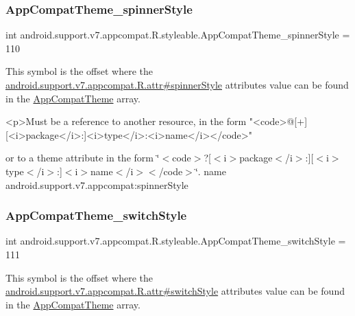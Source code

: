 \subsubsection{\texorpdfstring{App\+Compat\+Theme\+\_\+spinner\+Style}{AppCompatTheme\_spinnerStyle}}
{\footnotesize\ttfamily int android.\+support.\+v7.\+appcompat.\+R.\+styleable.\+App\+Compat\+Theme\+\_\+spinner\+Style = 110\hspace{0.3cm}{\ttfamily [static]}}

This symbol is the offset where the \hyperlink{classandroid_1_1support_1_1v7_1_1appcompat_1_1R_1_1attr_a756d2c11dcb65821e13f93739bb74526}{android.\+support.\+v7.\+appcompat.\+R.\+attr\#spinner\+Style} attribute\textquotesingle{}s value can be found in the \hyperlink{classandroid_1_1support_1_1v7_1_1appcompat_1_1R_1_1styleable_a5c42f89e8a410c323be34208d75c430b}{App\+Compat\+Theme} array.

\begin{DoxyVerb}      <p>Must be a reference to another resource, in the form "<code>@[+][<i>package</i>:]<i>type</i>:<i>name</i></code>"
\end{DoxyVerb}
 or to a theme attribute in the form \char`\"{}$<$code$>$?\mbox{[}$<$i$>$package$<$/i$>$\+:\mbox{]}\mbox{[}$<$i$>$type$<$/i$>$\+:\mbox{]}$<$i$>$name$<$/i$>$$<$/code$>$\char`\"{}.  name android.\+support.\+v7.\+appcompat\+:spinner\+Style \mbox{\label{classandroid_1_1support_1_1v7_1_1appcompat_1_1R_1_1styleable_a57e1f510b55a34ce46089f5c131a9d99}} 
\subsubsection{\texorpdfstring{App\+Compat\+Theme\+\_\+switch\+Style}{AppCompatTheme\_switchStyle}}
{\footnotesize\ttfamily int android.\+support.\+v7.\+appcompat.\+R.\+styleable.\+App\+Compat\+Theme\+\_\+switch\+Style = 111\hspace{0.3cm}{\ttfamily [static]}}

This symbol is the offset where the \hyperlink{classandroid_1_1support_1_1v7_1_1appcompat_1_1R_1_1attr_aa7ea181c951ce6ec2cc6cbbb8d368909}{android.\+support.\+v7.\+appcompat.\+R.\+attr\#switch\+Style} attribute\textquotesingle{}s value can be found in the \hyperlink{classandroid_1_1support_1_1v7_1_1appcompat_1_1R_1_1styleable_a5c42f89e8a410c323be34208d75c430b}{App\+Compat\+Theme} array.

